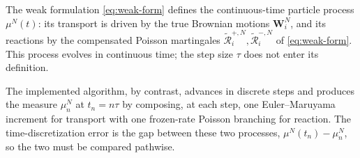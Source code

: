 \documentclass[a4paper,fleqn]{cas-sc}
\theoremstyle{definition}
\theoremstyle{remark}
\begin{document}
%


The weak formulation \eqref{eq:weak-form} defines the continuous-time particle
process $\mu^N(t)$: its transport is driven by the true Brownian motions
$\mathbf W^N_i$, and its reactions by the compensated Poisson martingales
$\widetilde{\mathcal R}^{+,N}_i,\widetilde{\mathcal R}^{-,N}_i$ of
\eqref{eq:weak-form}. This process evolves in continuous time; the step size
$\tau$ does not enter its definition.

The implemented algorithm, by contrast, advances in discrete steps and produces
the measure $\mu^N_n$ at $t_n=n\tau$ by composing, at each step, one
Euler--Maruyama increment for transport with one frozen-rate Poisson branching
for reaction. The time-discretization error is the gap between these two processes, $\mu^N(t_n)-\mu^N_n$, so the two must be compared
pathwise.
\end{document}
